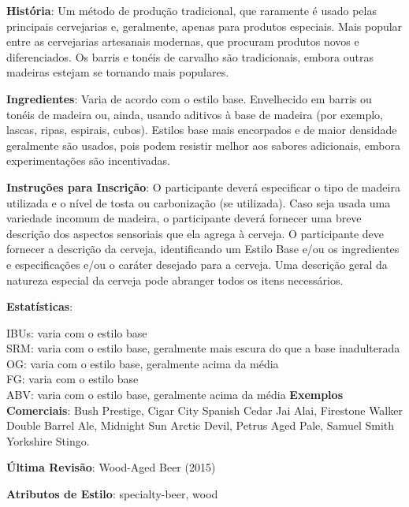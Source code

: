 \textbf{História}: Um método de produção tradicional, que raramente é usado pelas principais cervejarias e, geralmente, apenas para produtos especiais. Mais popular entre as cervejarias artesanais modernas, que procuram produtos novos e diferenciados. Os barris e tonéis de carvalho são tradicionais, embora outras madeiras estejam se tornando mais populares.

\textbf{Ingredientes}: Varia de acordo com o estilo base. Envelhecido em barris ou tonéis de madeira ou, ainda, usando aditivos à base de madeira (por exemplo, lascas, ripas, espirais, cubos). Estilos base mais encorpados e de maior densidade geralmente são usados, pois podem resistir melhor aos sabores adicionais, embora experimentações são incentivadas.

\textbf{Instruções para Inscrição}: O participante deverá especificar o tipo de madeira utilizada e o nível de tosta ou carbonização (se utilizada). Caso seja usada uma variedade incomum de madeira, o participante deverá fornecer uma breve descrição dos aspectos sensoriais que ela agrega à cerveja. O participante deve fornecer a descrição da cerveja, identificando um Estilo Base e/ou os ingredientes e especificações e/ou o caráter desejado para a cerveja. Uma descrição geral da natureza especial da cerveja pode abranger todos os itens necessários.

\textbf{Estatísticas}:

IBUs: varia com o estilo base\\
SRM: varia com o estilo base, geralmente mais escura do que a base inadulterada\\
OG: varia com o estilo base, geralmente acima da média\\
FG: varia com o estilo base\\
ABV: varia com o estilo base, geralmente acima da média
\textbf{Exemplos Comerciais}: Bush Prestige, Cigar City Spanish Cedar Jai Alai, Firestone Walker Double Barrel Ale, Midnight Sun Arctic Devil, Petrus Aged Pale, Samuel Smith Yorkshire Stingo.

\textbf{Última Revisão}: Wood-Aged Beer (2015)

\textbf{Atributos de Estilo}: specialty-beer, wood
